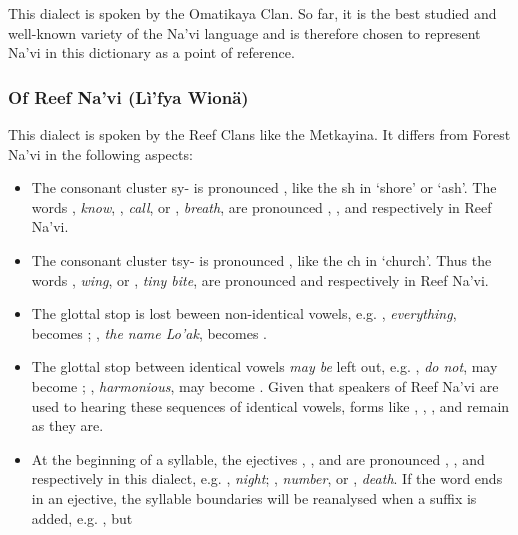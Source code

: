 This dialect is spoken by the Omatikaya Clan. So far, it is the best studied and well\hyp{}known variety of the Na'vi language and is therefore chosen to represent Na'vi in this dictionary as a point of reference.  

\subsubsection*{Of Reef Na'vi (Lì'fya Wionä)} 

This dialect is spoken by the Reef Clans like the Metkayina. It differs from Forest Na'vi in the following aspects:

\begin{itemize}

	\item The consonant cluster sy- \I{[sj]} is pronounced \I{[S]}, like the sh in `shore' or `ash'. The words , \emph{know}, , \emph{call}, or , \emph{breath}, are pronounced \I{[Sawm]}, \I{[Saw]}, and \I{["SE.ha]} respectively in Reef Na'vi.
	\item The consonant cluster tsy- \I{[\t{ts}j]} is pronounced \I{[\t{tS}]}, like the ch in `church'. Thus the words , \emph{wing}, or , \emph{tiny bite}, are pronounced \I{[\t{tS}al]} and \I{["\t{tS}Ej.\t{tS}Ip\textcorner]} respectively in Reef Na'vi.
	\item The glottal stop is lost beween non\hyp{}identical vowels, e.g. , \emph{everything}, becomes ; , \emph{the name Lo'ak}, becomes .
	\item The glottal stop between identical vowels \emph{may be} left out, e.g. , \emph{do not}, may become  \I{[R\ae."{}\ae]}; , \emph{harmonious}, may become  \I{[mE."{}Em]}.
		\subitem Given that speakers of Reef Na'vi are used to hearing these sequences of identical vowels, forms like  \I{[a."ba.a]},  \I{[mE."{}E.vEN]},  \I{[sE.i."{}i]}, and  \I{[pE.E."gi.nUm]} remain as they are. 
	\item At the beginning of a syllable, the ejectives  \I{[p']},  \I{[t']}, and  \I{[k']} are pronounced \I{[b]}, \I{[d]}, and \I{[g]} respectively in this dialect, e.g.  \I{[don]}, \emph{night};  , \emph{number}, or  \I{[git']}, \emph{death}.
		\subitem If the word ends in an ejective, the syllable boundaries will be reanalysed when a suffix is added, e.g.  \I{[Pawk']}, but  

\end{itemize}
